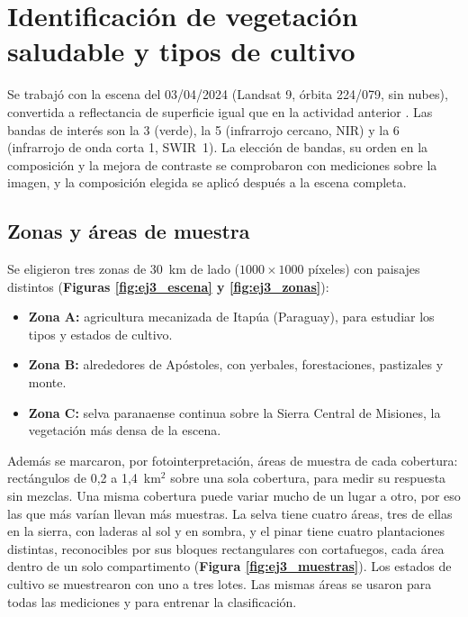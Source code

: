 \section{Identificación de vegetación saludable y tipos de cultivo}

    \newcommand{\grupo}[2]{\textcolor[HTML]{#1}{\rule{0.8em}{0.8em}}~\textbf{#2}}

    Se trabajó con la escena del 03/04/2024 (Landsat 9, órbita 224/079, sin nubes), convertida a reflectancia de superficie igual que en la actividad anterior \cite{ej2_usgs_l2}. Las bandas de interés son la 3 (verde), la 5 (infrarrojo cercano, NIR) y la 6 (infrarrojo de onda corta 1, SWIR~1). La elección de bandas, su orden en la composición y la mejora de contraste se comprobaron con mediciones sobre la imagen, y la composición elegida se aplicó después a la escena completa.

    \subsection{Zonas y áreas de muestra}

        Se eligieron tres zonas de 30~km de lado ($1000 \times 1000$ píxeles) con paisajes distintos (\textbf{Figuras \ref{fig:ej3_escena} y \ref{fig:ej3_zonas}}):

        \begin{itemize}
            \item \textbf{Zona A:} agricultura mecanizada de Itapúa (Paraguay), para estudiar los tipos y estados de cultivo.
            \item \textbf{Zona B:} alrededores de Apóstoles, con yerbales, forestaciones, pastizales y monte.
            \item \textbf{Zona C:} selva paranaense continua sobre la Sierra Central de Misiones, la vegetación más densa de la escena.
        \end{itemize}

        Además se marcaron, por fotointerpretación, áreas de muestra de cada cobertura: rectángulos de 0,2 a 1,4~km$^2$ sobre una sola cobertura, para medir su respuesta sin mezclas. Una misma cobertura puede variar mucho de un lugar a otro, por eso las que más varían llevan más muestras. La selva tiene cuatro áreas, tres de ellas en la sierra, con laderas al sol y en sombra, y el pinar tiene cuatro plantaciones distintas, reconocibles por sus bloques rectangulares con cortafuegos, cada área dentro de un solo compartimento (\textbf{Figura \ref{fig:ej3_muestras}}). Los estados de cultivo se muestrearon con uno a tres lotes. Las mismas áreas se usaron para todas las mediciones y para entrenar la clasificación.

